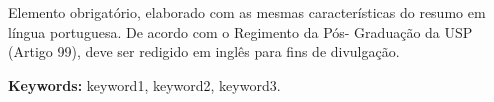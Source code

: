 \documentclass[12pt,twoside,a4paper]{book}
\numberwithin{equation}{section}
\begin{document}
Elemento obrigatório, elaborado com as mesmas características do resumo em
língua portuguesa. De acordo com o Regimento da Pós- Graduação da USP (Artigo
99), deve ser redigido em inglês para fins de divulgação. 




\noindent \textbf{Keywords:} keyword1, keyword2, keyword3.

\tableofcontents    %

\printglossary[type=\acronymtype,title=Lista de Abreviaturas]

\printglossary[type=symbols,title=Lista de S\'imbolos]




\end{document}
